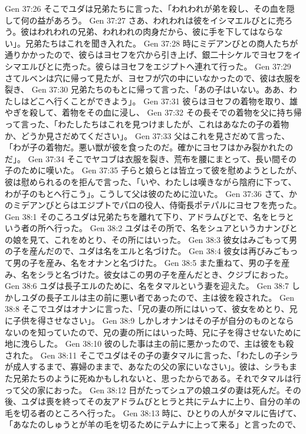 Gen 37:26  そこでユダは兄弟たちに言った、「われわれが弟を殺し、その血を隠して何の益があろう。
Gen 37:27  さあ、われわれは彼をイシマエルびとに売ろう。彼はわれわれの兄弟、われわれの肉身だから、彼に手を下してはならない」。兄弟たちはこれを聞き入れた。
Gen 37:28  時にミデアンびとの商人たちが通りかかったので、彼らはヨセフを穴から引き上げ、銀二十シケルでヨセフをイシマエルびとに売った。彼らはヨセフをエジプトへ連れて行った。
Gen 37:29  さてルベンは穴に帰って見たが、ヨセフが穴の中にいなかったので、彼は衣服を裂き、
Gen 37:30  兄弟たちのもとに帰って言った、「あの子はいない。ああ、わたしはどこへ行くことができよう」。
Gen 37:31  彼らはヨセフの着物を取り、雄やぎを殺して、着物をその血に浸し、
Gen 37:32  その長そでの着物を父に持ち帰って言った、「わたしたちはこれを見つけましたが、これはあなたの子の着物か、どうか見さだめてください」。
Gen 37:33  父はこれを見さだめて言った、「わが子の着物だ。悪い獣が彼を食ったのだ。確かにヨセフはかみ裂かれたのだ」。
Gen 37:34  そこでヤコブは衣服を裂き、荒布を腰にまとって、長い間その子のために嘆いた。
Gen 37:35  子らと娘らとは皆立って彼を慰めようとしたが、彼は慰められるのを拒んで言った、「いや、わたしは嘆きながら陰府に下って、わが子のもとへ行こう」。こうして父は彼のために泣いた。
Gen 37:36  さて、かのミデアンびとらはエジプトでパロの役人、侍衛長ポテパルにヨセフを売った。
Gen 38:1  そのころユダは兄弟たちを離れて下り、アドラムびとで、名をヒラという者の所へ行った。
Gen 38:2  ユダはその所で、名をシュアというカナンびとの娘を見て、これをめとり、その所にはいった。
Gen 38:3  彼女はみごもって男の子を産んだので、ユダは名をエルと名づけた。
Gen 38:4  彼女は再びみごもって男の子を産み、名をオナンと名づけた。
Gen 38:5  また重ねて、男の子を産み、名をシラと名づけた。彼女はこの男の子を産んだとき、クジブにおった。
Gen 38:6  ユダは長子エルのために、名をタマルという妻を迎えた。
Gen 38:7  しかしユダの長子エルは主の前に悪い者であったので、主は彼を殺された。
Gen 38:8  そこでユダはオナンに言った、「兄の妻の所にはいって、彼女をめとり、兄に子供を得させなさい」。
Gen 38:9  しかしオナンはその子が自分のものとならないのを知っていたので、兄の妻の所にはいった時、兄に子を得させないために地に洩らした。
Gen 38:10  彼のした事は主の前に悪かったので、主は彼をも殺された。
Gen 38:11  そこでユダはその子の妻タマルに言った、「わたしの子シラが成人するまで、寡婦のままで、あなたの父の家にいなさい」。彼は、シラもまた兄弟たちのように死ぬかもしれないと、思ったからである。それでタマルは行って父の家におった。
Gen 38:12  日がたってシュアの娘ユダの妻は死んだ。その後、ユダは喪を終ってその友アドラムびとヒラと共にテムナに上り、自分の羊の毛を切る者のところへ行った。
Gen 38:13  時に、ひとりの人がタマルに告げて、「あなたのしゅうとが羊の毛を切るためにテムナに上って来る」と言ったので、

